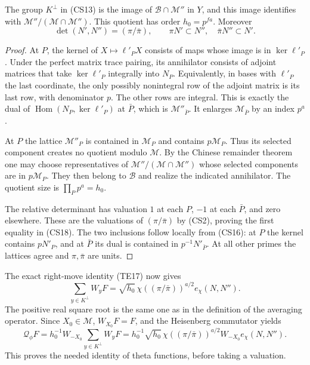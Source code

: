 \begin{lemma}\label{csp-companion}
The group $K^\perp$ in (CS13) is the image of
$\mathcal B\cap\mathcal M''$ in $Y$, and this image
identifies with
$\mathcal M''/(\mathcal M\cap\mathcal M'')$.
This quotient has order $h_0=p^{fa}$.  Moreover
\[
        \det(N',N'')=(\pi/\bar\pi),\qquad
        \pi N'\subset N'',\quad \bar\pi N''\subset N'.     \tag{CS18}
\]
\end{lemma}
\begin{proof}
At $P$, the kernel of $X\mapsto\ell'_PX$ consists of maps
whose image is in $\ker\ell'_P$.  Under the perfect matrix
trace pairing, its annihilator consists of adjoint matrices
that take $\ker\ell'_P$ integrally into $N_P$.
Equivalently, in bases with $\ell'_P$ the last coordinate,
the only possibly nonintegral row of the adjoint matrix is
its last row, with denominator $p$.  The other rows are
integral.  This is exactly the dual of
$\operatorname{Hom}(N_P,\ker\ell'_P)$ at $\bar P$,
which is $\mathcal M''_{\bar P}$.
It enlarges $\mathcal M_{\bar P}$ by an index $p^a$.

At $P$ the lattice $\mathcal M''_P$ is contained in
$\mathcal M_P$ and contains $p\mathcal M_P$.
Thus its selected component creates no quotient modulo
$\mathcal M$.  By the Chinese remainder theorem one may
choose representatives of $\mathcal M''/(\mathcal M\cap\mathcal M'')$
whose selected components are in $p\mathcal M_P$.
They then belong to $\mathcal B$ and realize the indicated
annihilator.  The quotient size is $\prod_Pp^a=h_0$.

The relative determinant has valuation $1$ at each $P$,
$-1$ at each $\bar P$, and zero elsewhere.  These are
the valuations of $(\pi/\bar\pi)$ by (CS2), proving the
first equality in (CS18).  The two inclusions follow
locally from (CS16): at $P$ the kernel contains $pN'_P$,
and at $\bar P$ its dual is contained in $p^{-1}N'_{\bar P}$.
At all other primes the lattices agree and $\pi,\bar\pi$
are units.
\end{proof}

The exact right-move identity (TE17) now gives
\[
 \sum_{y\in K^\perp}W_yF
      =\sqrt{h_0}\,\chi((\pi/\bar\pi))^{a/2}
                                      e_\chi(N,N'').        \tag{CS19}
\]
The positive real square root is the same one as in the
definition of the averaging operator.  Since $X_0\in\mathcal M$,
$W_{X_0}F=F$, and the Heisenberg commutator yields
\[
 \mathcal Q_\phi F
    =h_0^{-1}W_{-X_0}\sum_{y\in K^\perp}W_yF
    =h_0^{-1}\sqrt{h_0}\,
       \chi((\pi/\bar\pi))^{a/2}
                              W_{-X_0}e_\chi(N,N'').       \tag{CS20}
\]
This proves the needed identity of theta functions, before
taking a valuation.

